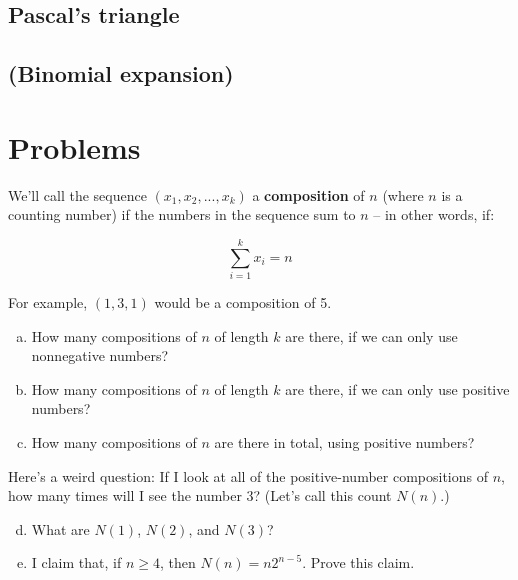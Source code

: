 \subsection{Pascal's triangle}

\subsection{(Binomial expansion)}




\newpage
\section{Problems}

% 
\begin{problem}
\label{composition-num-3s}

We'll call the sequence $(x_1, x_2, ..., x_k)$ a \textbf{composition} of $n$ (where $n$ is a counting number) if the numbers in the sequence sum to $n$ -- in other words, if:

\begin{equation*}
\sum_{i=1}^k x_i = n
\end{equation*}

For example, $(1,3,1)$ would be a composition of 5.

\begin{enumerate}[(a)]
\item How many compositions of $n$ of length $k$ are there, if we can only use nonnegative numbers? %
\item How many compositions of $n$ of length $k$ are there, if we can only use positive numbers? %
\item How many compositions of $n$ are there in total, using positive numbers? %
\end{enumerate}

Here's a weird question: If I look at all of the positive-number compositions of $n$, how many times will I see the number 3? (Let's call this count $N(n)$.)

\begin{enumerate}[(a)]
\setcounter{enumi}{3}
\item What are $N(1)$, $N(2)$, and $N(3)$?
\item I claim that, if $n \geq 4$, then $N(n) = n2^{n-5}$. Prove this claim. 
\end{enumerate}




\end{problem}



